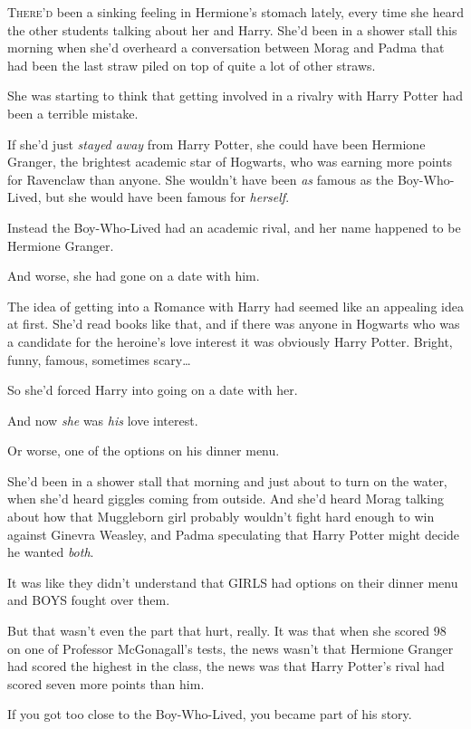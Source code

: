 
\lettrine{T}{here'd} been a sinking feeling in Hermione's stomach lately, every time she 
heard the other students talking about her and Harry. She'd been in a shower 
stall this morning when she'd overheard a conversation between Morag and Padma 
that had been the last straw piled on top of quite a lot of other straws.

She was starting to think that getting involved in a rivalry with Harry Potter 
had been a terrible mistake.

If she'd just \emph{stayed away} from Harry Potter, she could have been 
Hermione Granger, the brightest academic star of Hogwarts, who was earning more 
points for Ravenclaw than anyone. She wouldn't have been \emph{as} famous as 
the Boy-Who-Lived, but she would have been famous for \emph{herself}.

Instead the Boy-Who-Lived had an academic rival, and her name happened to be 
Hermione Granger.

And worse, she had gone on a date with him.

The idea of getting into a Romance with Harry had seemed like an appealing idea 
at first. She'd read books like that, and if there was anyone in Hogwarts who 
was a candidate for the heroine's love interest it was obviously Harry Potter. 
Bright, funny, famous, sometimes scary{\ldots}

So she'd forced Harry into going on a date with her.

And now \emph{she} was \emph{his} love interest.

Or worse, one of the options on his dinner menu.

She'd been in a shower stall that morning and just about to turn on the water, 
when she'd heard giggles coming from outside. And she'd heard Morag talking 
about how that Muggleborn girl probably wouldn't fight hard enough to win 
against Ginevra Weasley, and Padma speculating that Harry Potter might decide 
he wanted \emph{both}.

It was like they didn't understand that GIRLS had options on their dinner menu 
and BOYS fought over them.

But that wasn't even the part that hurt, really. It was that when she scored 98 
on one of Professor McGonagall's tests, the news wasn't that Hermione Granger 
had scored the highest in the class, the news was that Harry Potter's rival had 
scored seven more points than him.

If you got too close to the Boy-Who-Lived, you became part of his story.

